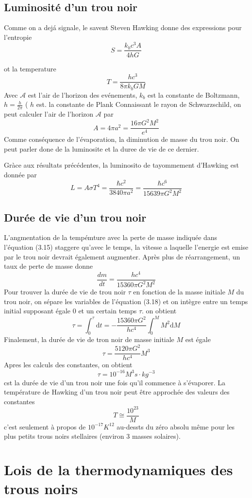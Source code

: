\subsection {Luminosité d'un trou noir}
Comme on a dejá signale, le savent Steven Hawking donne des expressions pour l'entropie
$$
S=\frac{k_{b} c^{3} A}{4 h G}
$$

ot la temperature
$$
T=\frac{h c^{3}}{8 \pi k_{b} G M}
$$
Avec $\mathcal{A}$ est l'air de l'horizon des evénements, $k_{b}$ est la constante de Boltzmann, $h=\frac{h}{2 \pi}$ ( $h$ est. la constante de Plank Connaissant le rayon de Schwarzschild, on peut calculer l'air de l'horizon $\mathcal{A}$ par
$$
A=4 \pi a^{2}=\frac{16 \pi G^{2} M^{2}}{e^{4}}
$$
Comme conséquence de l'évaporation, la diminution de masse du trou noir. On peut parler done de la luminosite et la duree de vie de ce dernier.

Gràce aux résultats précédentes, la luminosito de tayommement d'Hawking est donnée par
$$
L=A \sigma T^{4}=\frac{\hbar c^{2}}{3840 \pi a^{2}}=\frac{\hbar c^{6}}{15639 \pi G^{2} M^{2}}
$$
\subsection { Durée de vie d'un trou noir}
L'angmentation de la tempémture avec la perte de masse indiquée dans l'équation
(3.15) staggere qu'avec le temps, la vitesse a laquelle l'energie est emise par le trou noir devrait également augmenter. Après plus de réarrangement, un taux de perte de masse donne
$$
\frac{d m}{d t}=\frac{h c^{4}}{15360 \pi G^{2} M^{2}}
$$
Pour trouver la durée de vie de trou noir $\tau$ en fonction de la masse initiale $M$ du trou noir, on sépare les variables de l'équation (3.18) et on intègre entre un temps initial supposant égale 0 et un certain temps $\tau$. on obtient
$$
\tau=\int_{0}^{\tau} \mathrm{d} t=-\frac{15360 \pi G^{2}}{h c^{4}} \int_{0}^{M} M^{2} \mathrm{d} M
$$
Finalement, la durée de vie de tron noir de masse initiale $M$ est égale
$$
\tau=\frac{5120 \pi G^{2}}{h c^{4}} M^{3}
$$
Apres les calculs des constantes, on obtient
$$
\tau=10^{-16} M^{3} s \cdot k g^{-3}
$$
cst la durée de vie d'un trou noir une fois qu'il commence à s'évaporer. La température de Hawking d'un trou noir peut être approchée des valeurs des constantes
$$
T \cong \frac{10^{23}}{M}
$$
c'est seulement à propos de $10^{-17} K^{12}$ au-dessts du zéro absolu même pour les plus petits trous noirs stellaires (environ 3 masses solaires).




\section{ Lois de la thermodynamiques des trous noirs}

